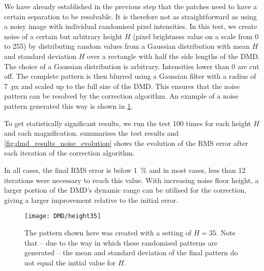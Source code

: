 We have already established in the previous step that the patches need to have a certain separation to be resolvable. It is therefore not as straightforward as using a noisy image with individual randomised pixel intensities. In this test, we create noise of a certain but arbitrary height $H$ (pixel brightness value on a scale from 0 to 255) by distributing random values from a Gaussian distribution with mean $H$ and standard deviation $H$ over a rectangle with half the side lengths of the DMD. The choice of a Gaussian distribution is arbitrary. Intensities lower than 0 are cut off. The complete pattern is then blurred using a Gaussian filter with a radius of \SI{7}{px} and scaled up to the full size of the DMD. This ensures that the noise pattern can be resolved by the correction algorithm. An example of a noise pattern generated this way is shown in \cref{fig:dmd_noise_example}.

To get statistically significant results, we run the test 100 times for each height $H$ and each magnification.
%
 summarises the test results and \cref{fig:dmd_results_noise_evolution} shows the evolution of the RMS error after each iteration of the correction algorithm.

In all cases, the final RMS error is below \SI{1}{\percent} and in most cases, less than 12 iterations were necessary to reach this value. With increasing noise floor height, a larger portion of the DMD's dynamic range can be utilised for the correction, giving a larger improvement relative to the initial error. 

\vfill
\begin{figure}[hbp]
    \centering
    \texttt{[image: DMD/height35]}
    \caption[Artificial noise floor pattern]{The pattern shown here was created with a setting of $H=35$. Note that -- due to the way in which these randomised patterns are generated -- the mean and standard deviation of the final pattern do not equal the initial value for $H$.}
    \label{fig:dmd_noise_example}
\end{figure}
\vfill

